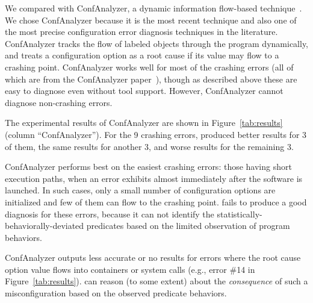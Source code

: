 
We compared \ourtool with ConfAnalyzer, a dynamic information
flow-based technique~\cite{Rabkin:2011:PPC}.
We chose ConfAnalyzer because it is the most recent technique and
also one of the most precise configuration error diagnosis techniques
in the literature.
ConfAnalyzer tracks the flow of labeled objects through the
program dynamically,
and treats a configuration option as a root cause if its
value may flow to a crashing point.
ConfAnalyzer works well for most of the crashing errors (all of
which are from the ConfAnalyzer paper~\cite{Rabkin:2011:PPC}), though as
described above these are easy to diagnose even without tool
support. However, ConfAnalyzer cannot diagnose non-crashing errors.

The experimental results of ConfAnalyzer are shown in
Figure~\ref{tab:results} (column ``ConfAnalyzer'').
For the 9 crashing errors, \ourtool produced better results for 3 of them,
the same results for another 3, and worse results for the remaining 3.

ConfAnalyzer performs best on the easiest crashing errors:  those
having short execution paths, when an error exhibits
almost immediately after the software is launched.
In such cases, only a small number of configuration options are initialized and
few of them can flow to the crashing point. 
\ourtool fails to produce a good diagnosis for these errors, because it can not identify
 the statistically-behaviorally-deviated predicates based on the limited
observation of program behaviors.

ConfAnalyzer outputs less accurate or no results
for errors where the root cause option value
flows into containers or system calls (e.g., error \#14 in Figure~\ref{tab:results}).
\ourtool can reason (to some extent) about the \textit{consequence} of
such a misconfiguration based on the observed predicate behaviors.

